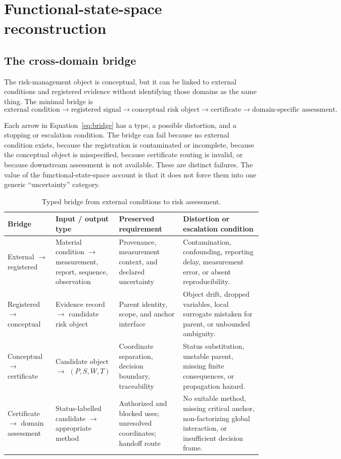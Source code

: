 \documentclass[10pt]{article}
\begin{document}
\section{Functional-state-space reconstruction}
\label{sec:fss}

\subsection{The cross-domain bridge}

The risk-management object is conceptual, but it can be linked to external conditions and registered evidence without identifying those domains as the same thing. The minimal bridge is
\begin{equation}
\text{external condition}
\longrightarrow
\text{registered signal}
\longrightarrow
\text{conceptual risk object}
\longrightarrow
\text{certificate}
\longrightarrow
\text{domain-specific assessment}.
\label{eq:bridge}
\end{equation}

Each arrow in Equation~\eqref{eq:bridge} has a type, a possible distortion, and a stopping or escalation condition. The bridge can fail because no external condition exists, because the registration is contaminated or incomplete, because the conceptual object is misspecified, because certificate routing is invalid, or because downstream assessment is not available. These are distinct failures. The value of the functional-state-space account is that it does not force them into one generic ``uncertainty'' category.

\begin{table}[htbp]
\centering
\caption{Typed bridge from external conditions to risk assessment.}
\label{tab:bridge}
\begin{tabularx}{\textwidth}{>{\raggedright\arraybackslash}p{}p{}p{}X}
\toprule
Bridge & Input / output type & Preserved requirement & Distortion or escalation condition \\
\midrule
External $\to$ registered & Material condition $\to$ measurement, report, sequence, observation & Provenance, measurement context, and declared uncertainty & Contamination, confounding, reporting delay, measurement error, or absent reproducibility. \\
Registered $\to$ conceptual & Evidence record $\to$ candidate risk object & Parent identity, scope, and anchor interface & Object drift, dropped variables, local surrogate mistaken for parent, or unbounded ambiguity. \\
Conceptual $\to$ certificate & Candidate object $\to$ $(P,S,W,T)$ & Coordinate separation, decision boundary, traceability & Status substitution, unstable parent, missing finite consequences, or propagation hazard. \\
Certificate $\to$ domain assessment & Status-labelled candidate $\to$ appropriate method & Authorized and blocked uses; unresolved coordinates; handoff route & No suitable method, missing critical anchor, non-factorizing global interaction, or insufficient decision frame. \\
\bottomrule
\end{tabularx}
\end{table}
\end{document}
